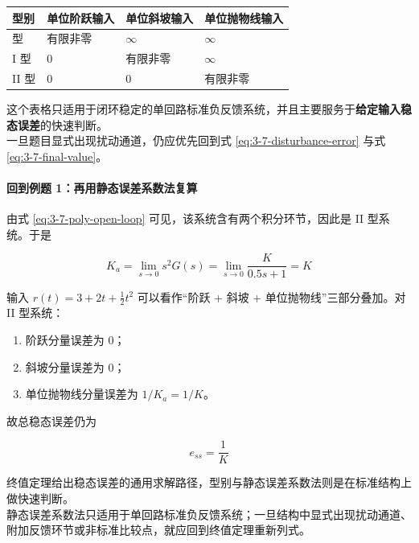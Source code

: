 \documentclass[
  11pt]{article}
\providecommand{\tightlist}{%
  \setlength{\itemsep}{0pt}\setlength{\parskip}{0pt}}
\begin{document}
\begin{longtable}[]{@{}llll@{}}
\toprule\noalign{}
型别 & 单位阶跃输入 & 单位斜坡输入 & 单位抛物线输入 \\
\midrule\noalign{}
\endhead
\bottomrule\noalign{}
\endlastfoot
0 型 & 有限非零 & \(\infty\) & \(\infty\) \\
I 型 & 0 & 有限非零 & \(\infty\) \\
II 型 & 0 & 0 & 有限非零 \\
\end{longtable}

这个表格只适用于闭环稳定的单回路标准负反馈系统，并且主要服务于\textbf{给定输入稳态误差}的快速判断。\\
一旦题目显式出现扰动通道，仍应优先回到式 \ref{eq:3-7-disturbance-error}
与式 \ref{eq:3-7-final-value}。

\paragraph{回到例题
1：再用静态误差系数法复算}\label{ux56deux5230ux4f8bux9898-1ux518dux7528ux9759ux6001ux8befux5deeux7cfbux6570ux6cd5ux590dux7b97}

由式 \ref{eq:3-7-poly-open-loop} 可见，该系统含有两个积分环节，因此是 II
型系统。于是

\begin{equation}
K_a=\lim_{s\to 0}s^2G(s)=\lim_{s\to 0}\frac{K}{0.5s+1}=K
\tag{3-7-19}\label{eq:3-7-ka-example}
\end{equation}

输入 \(r(t)=3+2t+\frac{1}{2}t^2\) 可以看作``阶跃 + 斜坡 +
单位抛物线''三部分叠加。对 II 型系统：

\begin{enumerate}
\def\labelenumi{\arabic{enumi}.}
\tightlist
\item
  阶跃分量误差为 0；
\item
  斜坡分量误差为 0；
\item
  单位抛物线分量误差为 \(1/K_a=1/K\)。
\end{enumerate}

故总稳态误差仍为

\begin{equation}
e_{ss}=\frac{1}{K}
\tag{3-7-20}\label{eq:3-7-ka-answer}
\end{equation}

终值定理给出稳态误差的通用求解路径，型别与静态误差系数法则是在标准结构上做快速判断。\\
静态误差系数法只适用于单回路标准负反馈系统；一旦结构中显式出现扰动通道、附加反馈环节或非标准比较点，就应回到终值定理重新列式。
\end{document}
